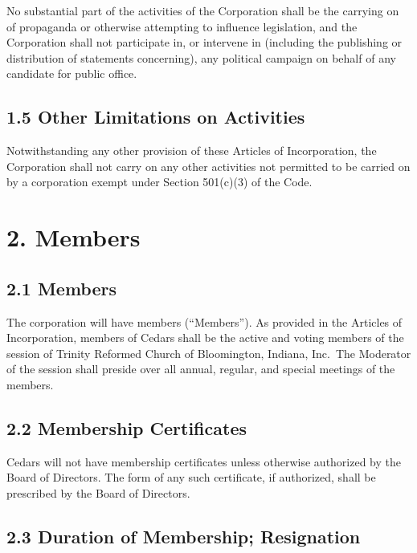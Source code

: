 \documentclass[
]{book}
\begin{document}
No substantial part of the activities of the Corporation shall be the carrying on of propaganda or otherwise attempting to influence legislation, and the Corporation shall not participate in, or intervene in (including the publishing or distribution of statements concerning), any political campaign on behalf of any candidate for public office.

\subsection*{1.5 Other Limitations on Activities}\label{other-limitations-on-activities}

Notwithstanding any other provision of these Articles of Incorporation, the Corporation shall not carry on any other activities not permitted to be carried on by a corporation exempt under Section 501(c)(3) of the Code.

\section*{2. Members}\label{members}

\subsection*{2.1 Members}\label{members-1}

The corporation will have members (``Members''). As provided in the Articles of Incorporation, members of Cedars shall be the active and voting members of the session of Trinity Reformed Church of Bloomington, Indiana, Inc.~The Moderator of the session shall preside over all annual, regular, and special meetings of the members.

\subsection*{2.2 Membership Certificates}\label{membership-certificates}

Cedars will not have membership certificates unless otherwise authorized by the Board of Directors. The form of any such certificate, if authorized, shall be prescribed by the Board of Directors.

\subsection*{2.3 Duration of Membership; Resignation}\label{duration-of-membership-resignation}
\end{document}
